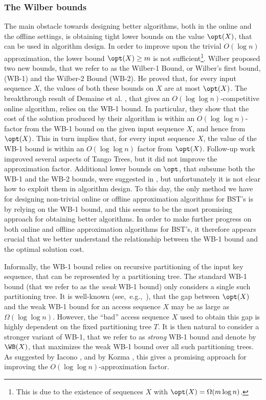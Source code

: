 \documentclass{toc}
\begin{document}
\subsubsection{The Wilber bounds} 

The main obstacle towards designing better algorithms, both in the online and the offline settings, is  obtaining tight lower bounds on the value $\opt(X)$, that can be used in algorithm design. 
%
%
%
In order to improve upon the trivial $O(\log n)$ approximation, the lower bound $\opt(X) \geq m$ is not sufficient\footnote{This is due to the existence of sequences $X$ with $\opt(X) = \Omega(m \log n)$.}. 
Wilber \cite{wilber} proposed two new bounds, that we refer to as the  Wilber-1 Bound, or Wilber's first bound, (WB-1) and the Wilber-2
Bound (WB-2). 
He proved that, for every input sequence $X$, the values of both these bounds on $X$ are at most $\opt(X)$. %
%
The breakthrough result of 
%
Demaine et al. \cite{tango}, that gives
an $O(\log\log n)$-competitive online algorithm, relies on the WB-1 bound. In particular, they show that the cost of the solution produced by their algorithm is within an $O(\log\log n)$-factor from the
WB-1 bound on the given input sequence $X$, and hence from $\opt(X)$. This in turn implies that, for every input sequence $X$, the value of the WB-1 bound is within an $O(\log\log n)$ factor from $\opt(X)$. Follow-up work \cite{multisplay,chain_splay} improved several
aspects of Tango Trees, but it did not improve the approximation factor. Additional lower bounds on $\opt$, that subsume both the WB-1 and the WB-2 bounds, were suggested in \cite{DHIKP09,DSW,Harmon}, but unfortunately it is not clear how to exploit them in algorithm design. %
To this day, the only method we have for designing non-trivial online or offline approximation algorithms for BST's is by relying on the WB-1 bound, and this seems to be the most promising approach for obtaining better algorithms.
In order to make further progress on both online and offline approximation algorithms for BST's, it therefore appears crucial that we better understand the relationship between the WB-1 bound and the optimal solution cost. 

Informally, the WB-1 bound relies on recursive partitioning of the input key sequence, that  can be represented by a partitioning tree. The standard WB-1 bound (that we refer to as the \emph{weak} WB-1 bound)  only considers a single such partitioning tree. It is well-known (see,~e.g.,~\cite{tango,multisplay,in_pursuit}), that the gap between $\opt(X)$
and the weak WB-1 bound for an access sequence $X$ may be as large as  $\Omega(\log\log n)$.  
However, the ``bad'' access sequence $X$ used to obtain this gap is highly dependent on the fixed partitioning tree $T$. It is then natural to consider a stronger variant of WB-1, that we refer to as \emph{strong} WB-1 bound and denote by $\WB(X)$, that maximizes the weak WB-1 bound over all such partitioning trees.
As suggested by  Iacono \cite{in_pursuit}, and by Kozma \cite{Kozma16_thesis}, this gives a promising approach for improving the $O(\log\log n)$-approximation factor. 
\end{document}
